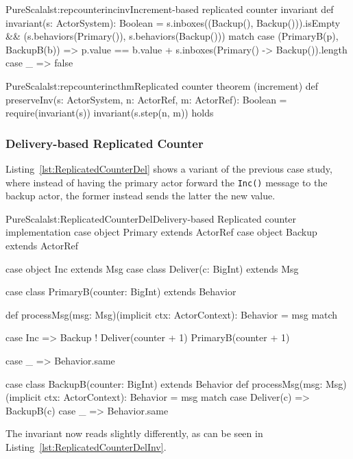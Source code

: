\documentclass[a4paper,twoside]{article}
\newcommand{\RefCode}[1]{Listing~\ref{#1}}
\newcommand{\stt}[1]{\texttt{\small{#1}}}
\begin{document}
\begin{Code}{PureScala}{lst:repcounterincinv}{Increment-based replicated counter invariant}
def invariant(s: ActorSystem): Boolean = {
  s.inboxes((Backup(), Backup())).isEmpty && {
    (s.behaviors(Primary()), s.behaviors(Backup())) match {
      case (PrimaryB(p), BackupB(b)) =>
        p.value == b.value + s.inboxes(Primary() -> Backup()).length
      case _ => false
    }	
  }
}
\end{Code}

\begin{Code}{PureScala}{lst:repcounterincthm}{Replicated counter theorem (increment)}
def preserveInv(s: ActorSystem, n: ActorRef, m: ActorRef): Boolean = {
  require(invariant(s))
  invariant(s.step(n, m))
} holds
\end{Code}

\subsubsection{Delivery-based Replicated Counter}

\RefCode{lst:ReplicatedCounterDel} shows a variant of the previous case study, where instead of having the primary actor forward the \stt{Inc()} message to the backup actor, the former instead sends the latter the new value.

\begin{Code}{PureScala}{lst:ReplicatedCounterDel}{Delivery-based Replicated counter implementation}
case object Primary extends ActorRef
case object Backup  extends ActorRef

case object Inc extends Msg
case class Deliver(c: BigInt) extends Msg

case class PrimaryB(counter: BigInt) extends Behavior {
  def processMsg(msg: Msg)(implicit ctx: ActorContext): Behavior = msg match {
    case Inc =>
      Backup ! Deliver(counter + 1)
      PrimaryB(counter + 1)

    case _ => Behavior.same
  }
}

case class BackupB(counter: BigInt) extends Behavior {
  def processMsg(msg: Msg)(implicit ctx: ActorContext): Behavior = msg match {
    case Deliver(c) => BackupB(c)
    case _          => Behavior.same
  }
}
\end{Code}

The invariant now reads slightly differently, as can be seen in \RefCode{lst:ReplicatedCounterDelInv}.
\end{document}
